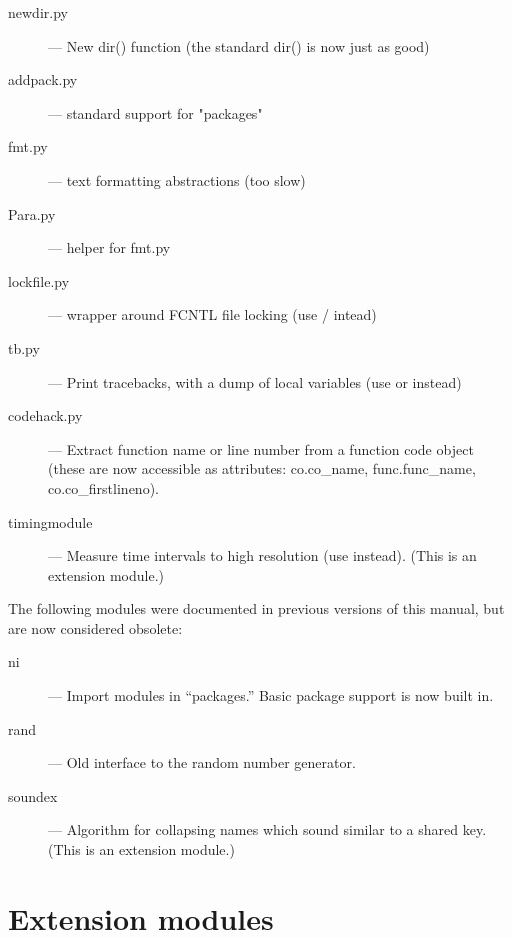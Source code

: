\begin{description}
\item[newdir.py]
--- New dir() function (the standard dir() is now just as good)

\item[addpack.py]
--- standard support for "packages"

\item[fmt.py]
--- text formatting abstractions (too slow)

\item[Para.py]
--- helper for fmt.py

\item[lockfile.py]
--- wrapper around FCNTL file locking (use
/ intead)

\item[tb.py]
--- Print tracebacks, with a dump of local variables (use
 or  instead)

\item[codehack.py]
--- Extract function name or line number from a function
code object (these are now accessible as attributes: co.co_name,
func.func_name, co.co_firstlineno).

\item[timingmodule]
--- Measure time intervals to high resolution (use
 instead).  (This is an extension module.)
\end{description}

The following modules were documented in previous versions of this
manual, but are now considered obsolete:

\begin{description}
\item[ni]
--- Import modules in ``packages.''  Basic package support is now
built in.

\item[rand]
--- Old interface to the random number generator.

\item[soundex]
--- Algorithm for collapsing names which sound similar to a shared
key.  (This is an extension module.)
\end{description}


\section{Extension modules}


